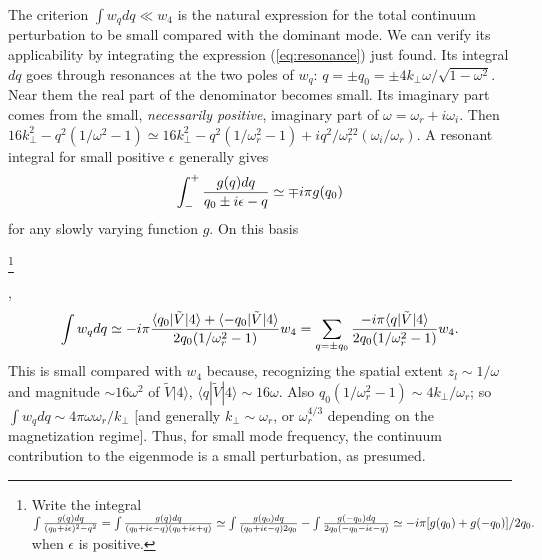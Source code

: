 \documentclass[12pt]{article}
\def\ket#1{|#1\rangle}
\def\bra#1{\langle#1}
\begin{document}
The criterion $\int w_q dq\ll w_4$ is the natural expression for the
total continuum perturbation to be small compared with the dominant
mode. We can verify its applicability by integrating the expression
(\ref{eq:resonance}) just found. Its integral $dq$ goes through
resonances at the two poles of $w_q$:
$q=\pm q_0=\pm4k_\perp\omega/\sqrt{1-\omega^2}$. Near them the real
part of the denominator becomes small. Its imaginary part comes from
the small, \emph{necessarily positive}, imaginary part of
$\omega=\omega_r+i\omega_i$. Then
$16k_\perp^2-q^2(1/\omega^2-1)\simeq 16k_\perp^2-q^2(1/\omega_r^2-1)
+iq^2/\omega_r^22(\omega_i/\omega_r)$.
A resonant integral for small
positive $\epsilon$ generally gives
\begin{equation}
  \label{resint}
  \int_{-}^{+} {g(q) dq\over q_0\pm i\epsilon-q}\simeq \mp i\pi g(q_0)
\end{equation}
for any slowly varying function $g$. On this basis
\iftrue
\footnote{Write the integral $\int{g(q)dq\over
  (q_0+i\epsilon)^2-q^2}=\int{g(q)dq\over 
(q_0+i\epsilon-q)(q_0+i\epsilon+q)}\simeq \int{g(q_0)dq\over
  (q_0+i\epsilon-q)2q_0}-\int{g(-q_0)dq\over
  2q_0(-q_0-i\epsilon-q) }\simeq -i\pi [g(q_0)+g(-q_0)]/2q_0. $ when
 $\epsilon$ is
positive.}
\fi
,
\begin{equation}
  \label{poles}
  \int w_q dq \simeq -i\pi {\bra{q_0}|\tilde{V}\ket{4}
    +\bra{-q_0}|\tilde{V}\ket{4}
    \over
    2q_0(1/\omega_r^2-1)
  }w_4
  =\sum_{q=\pm q_0}{-i\pi\bra{q}|\tilde{V}\ket{4}
    \over
    2q_0(1/\omega_r^2-1)}w_4.
\end{equation}
This is small compared with $w_4$ because, recognizing the spatial
extent $z_l\sim 1/\omega$ and magnitude $\sim 16\omega^2$ of
$\tilde V\ket{4}$, $\bra{q}|\tilde V \ket{4}\sim 16\omega$. Also
$q_0(1/\omega_r^2-1)\sim 4 k_\perp/\omega_r$; so
$\int w _q dq\sim 4\pi\omega\omega_r/k_\perp$ [and generally
$k_\perp\sim \omega_r$, or $\omega_r^{4/3}$ depending on the
magnetization regime]. Thus, for small mode frequency, the
continuum contribution to the eigenmode is a small perturbation, as
presumed.
\end{document}
